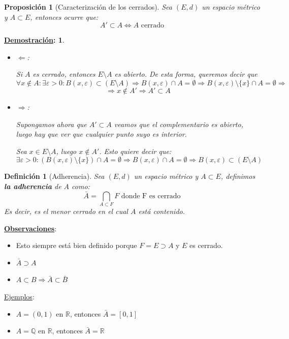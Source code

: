 \documentclass[10pt,a4paper,openright]{book}
\theoremstyle{break}
\newtheorem*{defi}{Definición}
\newtheorem*{prop}{Proposición}
\newtheorem*{demo}{\underline{Demostración}:}
\begin{document}
\begin{prop}[Caracterización de los cerrados]
Sea $(E,d)$ un espacio métrico y $A\subset E$, entonces ocurre que:
$$A'\subset A \Leftrightarrow A \mbox{ cerrado}$$
\end{prop}
\begin{demo}
\begin{itemize}
\item $\Leftarrow$:

Si $A$ es cerrado, entonces $E\setminus A$ es abierto. De esta forma, queremos decir que
$$\forall x \notin A : \exists \varepsilon > 0 : B(x,\varepsilon)\subset (E\setminus A) \Rightarrow B(x,\varepsilon) \cap A = \emptyset \Rightarrow B(x,\varepsilon)\setminus \{x\} \cap A = \emptyset \Rightarrow$$
$$\Rightarrow x \notin A' \Rightarrow A' \subset A$$

\item $\Rightarrow$:

Supongamos ahora que $A'\subset A$ veamos que el complementario es abierto, luego hay que ver que cualquier punto suyo es interior.

Sea $x\in E\setminus A$, luego $x\notin A'$. Esto quiere decir que:
$$\exists \varepsilon > 0 : \left(B(x,\varepsilon)\setminus\{x\}\right)\cap A = \emptyset \Rightarrow B(x,\varepsilon)\cap A = \emptyset \Rightarrow B(x,\varepsilon)\subset (E\setminus A)$$
\end{itemize}
\end{demo}

\begin{defi}[Adherencia]
Sea $(E,d)$ un espacio métrico y $A \subset E$, definimos \textbf{la adherencia} de $A$ como:
$$\bar{A} = \bigcap_{A\subset F } F \mbox{ donde F es cerrado}$$
Es decir, es el menor cerrado en el cual $A$ está contenido.
\end{defi}

\underline{\textbf{Observaciones}}:
\begin{itemize}
\item Esto siempre está bien definido porque $F=E\supset A$ y $E$ es cerrado.
\item $\bar{A}\supset A$
\item $A\subset B\Rightarrow \bar{A}\subset \bar{B}$
\end{itemize}

\underline{Ejemplos}:
\begin{itemize}
\item $A = (0,1)$ en $\mathbb{R}$, entonces $\bar{A} = [0,1]$
\item $A = \mathbb{Q}$ en $\mathbb{R}$, entonces $\bar{A} = \mathbb{R}$
\end{itemize}
\end{document}
